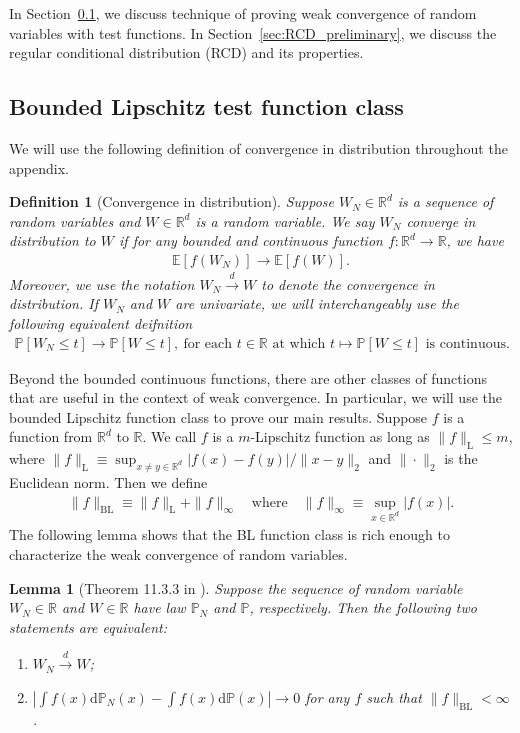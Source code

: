 \documentclass[12pt]{article}
\newtheorem{lemma}{Lemma}
\newtheorem{definition}{Definition}
\def\P{\mathbb{P}}
\def\P{\mathbb{P}}
\newcommand{\E}{\mathbb E}								%
\renewcommand{\P}{\mathbb{P}}							%
\newcommand{\R}{\mathbb{R}}								%
\newcommand{\convd}{\overset d \rightarrow}             %
\begin{document}
In Section~\ref{sec:BL_distance}, we discuss technique of proving weak convergence of random variables with test functions. In Section~\ref{sec:RCD_preliminary}, we discuss the regular conditional distribution (RCD) and its properties. 

\subsection{Bounded Lipschitz test function class}\label{sec:BL_distance}


We will use the following definition of convergence in distribution throughout the appendix.
\begin{definition}[Convergence in distribution]\label{def:convergence_distribution}
	Suppose $W_N\in\mathbb{R}^d$ is a sequence of random variables and $W\in\mathbb{R}^d$ is a random variable. We say $W_N$ converge in distribution to $W$ if for any bounded and continuous function $f:\mathbb{R}^d\rightarrow \mathbb{R}$, we have
	\begin{align*}
		\E[f(W_N)]\rightarrow \E[f(W)].
	\end{align*}
	Moreover, we use the notation $W_N\convd W$ to denote the convergence in distribution. If $W_N$ and $W$ are univariate, we will interchangeably use the following equivalent deifnition
	\begin{align*}
		\P[W_N\leq t]\rightarrow \P[W\leq t], \ \text{for each } t \in \R \text{ at which } t \mapsto \P[W \leq t] \text{ is continuous.}
	\end{align*}
\end{definition}

Beyond the bounded continuous functions, there are other classes of functions that are useful in the context of weak convergence. In particular, we will use the bounded Lipschitz function class to prove our main results. Suppose $f$ is a function from $\mathbb{R}^d$ to $\mathbb{R}$. We call $f$ is a $m$-Lipschitz function as long as $\|f\|_{\mathrm{L}}\leq m$, where \(\|f\|_{\mathrm{L}} \equiv \sup_{x \neq y \in \mathbb{R}^d} |f(x) - f(y)| / \|x - y\|_2\) and $\|\cdot\|_2$ is the Euclidean norm. Then we define 
\begin{align*}
	\|f\|_{\mathrm{BL}}\equiv \|f\|_{\mathrm{L}}+\|f\|_{\infty}\quad\text{where}\quad \|f\|_{\infty}\equiv \sup_{x\in\mathbb{R}^d}|f(x)|.
\end{align*}
\noindent The following lemma shows that the BL function class is rich enough to characterize the weak convergence of random variables.
\begin{lemma}[Theorem 11.3.3 in \citet{Dudley_2002}]\label{lem:Dudley_equivalence}
	Suppose the sequence of random variable $W_N\in\mathbb{R}$ and $W\in\mathbb{R}$ have law $\P_N$ and $\P$, respectively. Then the following two statements are equivalent:
	\begin{enumerate}
		\item $W_N\convd W$;
		\item $\left|\int f(x)\mathrm{d}\P_N(x)-\int f(x)\mathrm{d}\P(x)\right|\rightarrow0$ for any $f$ such that $\|f\|_{\mathrm{BL}}<\infty$.
	\end{enumerate}
\end{lemma}
\end{document}
